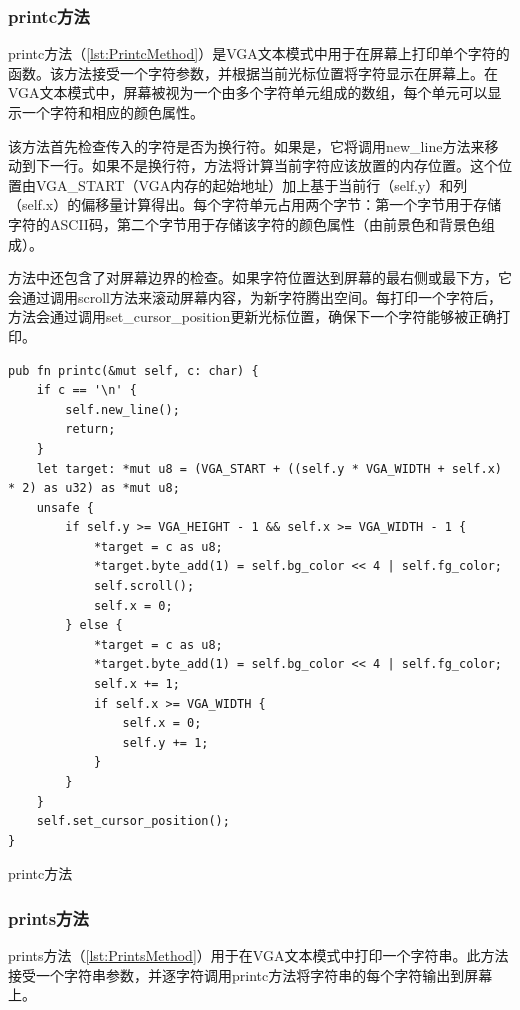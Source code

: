 \subsubsection{printc方法}

printc方法（\cref{lst:PrintcMethod}）是VGA文本模式中用于在屏幕上打印单个字符的函数。该方法接受一个字符参数，并根据当前光标位置将字符显示在屏幕上。在VGA文本模式中，屏幕被视为一个由多个字符单元组成的数组，每个单元可以显示一个字符和相应的颜色属性。

该方法首先检查传入的字符是否为换行符。如果是，它将调用new\_line方法来移动到下一行。如果不是换行符，方法将计算当前字符应该放置的内存位置。这个位置由VGA\_START（VGA内存的起始地址）加上基于当前行（self.y）和列（self.x）的偏移量计算得出。每个字符单元占用两个字节：第一个字节用于存储字符的ASCII码，第二个字节用于存储该字符的颜色属性（由前景色和背景色组成）。

方法中还包含了对屏幕边界的检查。如果字符位置达到屏幕的最右侧或最下方，它会通过调用scroll方法来滚动屏幕内容，为新字符腾出空间。每打印一个字符后，方法会通过调用set\_cursor\_position更新光标位置，确保下一个字符能够被正确打印。

\begin{listing}[htbp]
    \begin{verbatim}
pub fn printc(&mut self, c: char) {
    if c == '\n' {
        self.new_line();
        return;
    }
    let target: *mut u8 = (VGA_START + ((self.y * VGA_WIDTH + self.x) * 2) as u32) as *mut u8;
    unsafe {
        if self.y >= VGA_HEIGHT - 1 && self.x >= VGA_WIDTH - 1 {
            *target = c as u8;
            *target.byte_add(1) = self.bg_color << 4 | self.fg_color;
            self.scroll();
            self.x = 0;
        } else {
            *target = c as u8;
            *target.byte_add(1) = self.bg_color << 4 | self.fg_color;
            self.x += 1;
            if self.x >= VGA_WIDTH {
                self.x = 0;
                self.y += 1;
            }
        }
    }
    self.set_cursor_position();
}
    \end{verbatim}
    \caption{printc方法}\label{lst:PrintcMethod}
\end{listing}

\subsubsection{prints方法}

prints方法（\cref{lst:PrintsMethod}）用于在VGA文本模式中打印一个字符串。此方法接受一个字符串参数，并逐字符调用printc方法将字符串的每个字符输出到屏幕上。


